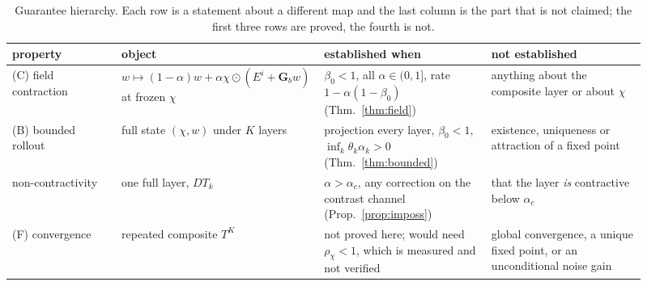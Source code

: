 \documentclass[journal,cmes,article,submit,moreauthors,pdftex]{Definitions/tsp}
\begin{document}
\begin{table}[htbp]
\centering
\caption{Guarantee hierarchy. Each row is a statement about a different map and the last column is
the part that is not claimed; the first three rows are proved, the fourth is not.}
\label{tab:hierarchy}
\small
\begin{tabular}{@{}p{0.17\linewidth}p{0.24\linewidth}p{0.26\linewidth}p{0.24\linewidth}@{}}
\toprule
property & object & established when & not established \\
\midrule
(C) field contraction & $w\mapsto(1-\alpha)w+\alpha\chi\odot(E^i+\mathbf{G}_bw)$ at frozen $\chi$
& $\beta_0<1$, all $\alpha\in(0,1]$, rate $1-\alpha(1-\beta_0)$ (Thm.~\ref{thm:field})
& anything about the composite layer or about $\chi$ \\
(B) bounded rollout & full state $(\chi,w)$ under $K$ layers
& projection every layer, $\beta_0<1$, $\inf_k\theta_k\alpha_k>0$ (Thm.~\ref{thm:bounded})
& existence, uniqueness or attraction of a fixed point \\
non-contractivity & one full layer, $DT_k$ & $\alpha>\alpha_c$, any correction on the contrast
channel (Prop.~\ref{prop:imposs}) & that the layer \emph{is} contractive below $\alpha_c$ \\
(F) convergence & repeated composite $T^K$
& not proved here; would need $\rho_\chi<1$, which is measured and not verified
& global convergence, a unique fixed point, or an unconditional noise gain \\
\bottomrule
\end{tabular}
\end{table}
\end{document}
